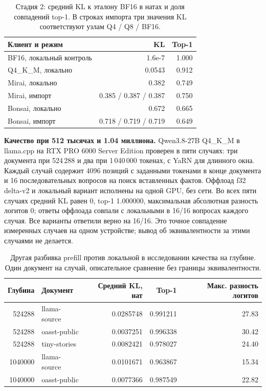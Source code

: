 \begin{table}[t]
\centering
\caption{Стадия 2: средний KL к эталону BF16 в натах и доля совпадений top-1.
В строках импорта три значения KL соответствуют узлам Q4 / Q8 / BF16.}
\label{tab:kl-stage2}
\footnotesize
\begin{tabular}{lrr}
\toprule
Клиент и режим & KL & Top-1 \\
\midrule
BF16, локальный контроль & 1.6e-7 & 1.000 \\
Q4\_K\_M, локально & 0.0543 & 0.912 \\
Mirai, локально & 0.382 & 0.749 \\
Mirai, импорт & 0.385 / 0.387 / 0.387 & 0.750 \\
Bonsai, локально & 0.672 & 0.665 \\
Bonsai, импорт & 0.718 / 0.719 / 0.719 & 0.649 \\
\bottomrule
\end{tabular}
\end{table}

\textbf{Качество при 512 тысячах и 1.04 миллиона.} Qwen3.8-27B Q4\_K\_M в llama.cpp на RTX PRO 6000
Server Edition проверен в пяти случаях: три документа при 524\,288 и два при 1\,040\,000 токенах,
с YaRN для длинного окна. Каждый случай содержит 4096 позиций с заданными токенами в конце документа
и 16 последовательных вопросов на поиск вставленных фактов.
Оффлоад f32 delta-v2 и локальный вариант исполнены на одной GPU, без сети.
Во всех пяти случаях средний KL равен 0, top-1 1.000000, максимальная абсолютная разность логитов 0;
ответы оффлоада совпали с локальными в 16/16 вопросах каждого случая. Все варианты ответили верно на 16/16.
Это точное совпадение измеренных случаев на одном устройстве; вывод об эквивалентности за этими случаями не делается.

\begin{table}[t]
\centering
\caption{Другая разбивка prefill против локальной в исследовании качества на глубине.
Один документ на случай, описательное сравнение без границы эквивалентности.}
\label{tab:depth-quality-partition}
\footnotesize
\begin{tabular}{rlrrr}
\toprule
Глубина & Документ & Средний KL, нат & Top-1 & Макс. разность логитов \\
\midrule
524288 & llama-source & 0.0285748 & 0.991211 & 27.83 \\
524288 & oasst-public & 0.0037251 & 0.996338 & 30.42 \\
524288 & tiny-stories & 0.0082421 & 0.978027 & 24.40 \\
1040000 & llama-source & 0.0101671 & 0.963867 & 15.34 \\
1040000 & oasst-public & 0.0077366 & 0.987549 & 22.82 \\
\bottomrule
\end{tabular}
\end{table}

